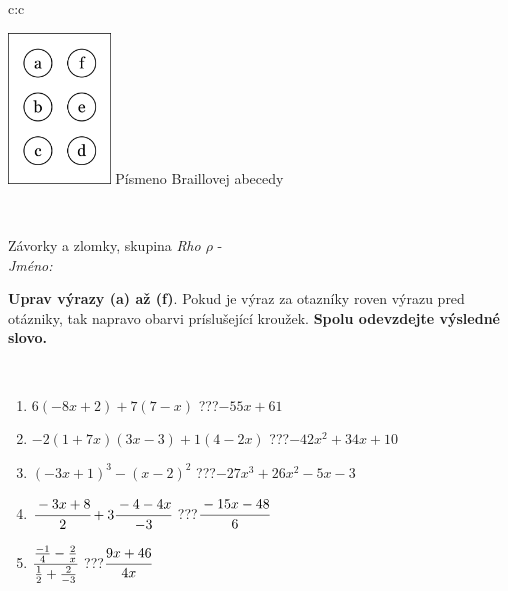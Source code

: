 \documentclass[10pt]{report}
\begin{document}
\begin{tabular}{c:c}
\begin{minipage}[c][104.5mm][t]{0.5\linewidth}
\begin{center}
\begin{minipage}{0.20\linewidth}
\begin{center}
\includegraphics[height=40mm]{../images/braille.png}
{\small Písmeno Braillovej abecedy}
\end{center}
\end{minipage}
\end{center}
\end{minipage}
\\ \hdashline
\begin{minipage}[c][104.5mm][t]{0.5\linewidth}
\begin{center}
\vspace{7mm}
{\huge Závorky a zlomky, skupina \textit{Rho $\rho$} -}\\[5mm]
\textit{Jméno:}\phantom{xxxxxxxxxxxxxxxxxxxxxxxxxxxxxxxxxxxxxxxxxxxxxxxxxxxxxxxxxxxxxxxxx}\\[5mm]
\begin{minipage}{0.95\linewidth}
\begin{center}
\textbf{Uprav výrazy (a) až (f)}. Pokud je výraz za otazníky roven výrazu pred otázniky, tak napravo obarvi príslušející kroužek. \textbf{Spolu odevzdejte výsledné slovo.}
\end{center}
\end{minipage}
\\[1mm]
\begin{minipage}{0.79\linewidth}
\begin{center}
\begin{varwidth}{\linewidth}
\begin{enumerate}
\normalsize
\item $6(-8x+2)+7(7-x)$\quad \dotfill\; ???\;\dotfill \quad $-55x+61$
\item $-2(1+7x)(3x-3)+1(4-2x)$\quad \dotfill\; ???\;\dotfill \quad $-42x^2+34x+10$
\item $(-3x+1)^3-(x-2)^2$\quad \dotfill\; ???\;\dotfill \quad $-27x^3+26x^2-5x-3$
\item $\cfrac{-3x+8}{2}+3\cfrac{-4-4x}{-3}$\quad \dotfill\; ???\;\dotfill \quad $\cfrac{-15x-48}{6}$
\item $\cfrac{\frac{-1}{4}-\frac{2}{x}}{\frac{1}{2}+\frac{2}{-3}}$\quad \dotfill\; ???\;\dotfill \quad $\cfrac{9x+46}{4x}$

\end{enumerate}
\end{varwidth}
\end{center}
\end{minipage}
\end{center}
\end{minipage}
\end{tabular}
\end{document}
